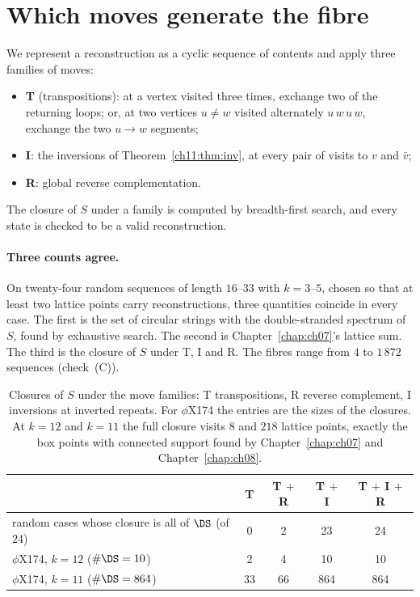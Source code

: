 \section{Which moves generate the fibre}\label{ch11:sec:gen}

We represent a reconstruction as a cyclic sequence of contents and apply three families of moves:
\begin{itemize}
\item \textbf{T} (transpositions): at a vertex visited three times, exchange two of the returning
loops; or, at two vertices $u\ne w$ visited alternately $u\,w\,u\,w$, exchange the two $u\to w$
segments;
\item \textbf{I}: the inversions of Theorem~\ref{ch11:thm:inv}, at every pair of visits to $v$ and $\bar v$;
\item \textbf{R}: global reverse complementation.
\end{itemize}
The closure of $S$ under a family is computed by breadth-first search, and every state is checked to be a
valid reconstruction.

\paragraph{Three counts agree.} On twenty-four random sequences of length $16$--$33$ with $k=3$--$5$,
chosen so that at least two lattice points carry reconstructions, three quantities coincide in every
case. The first is the set of circular strings with the double-stranded spectrum of $S$, found by
exhaustive search. The second is Chapter~\ref{chap:ch07}'s lattice sum. The third is the closure of $S$ under T, I and R.
The fibres range from $4$ to $1\,872$ sequences (check~(C)).

\begin{table}[t]
\centering\small
\begin{tabular}{lcccc}
\toprule
& T & T $+$ R & T $+$ I & T $+$ I $+$ R\\
\midrule
random cases whose closure is all of $\DS$ (of $24$) & 0 & 2 & 23 & 24\\
$\phi$X174, $k=12$ ($\#\DS=10$) & 2 & 4 & 10 & 10\\
$\phi$X174, $k=11$ ($\#\DS=864$) & 33 & 66 & 864 & 864\\
\bottomrule
\end{tabular}
\caption{Closures of $S$ under the move families: T transpositions, R reverse complement, I inversions
at inverted repeats. For $\phi$X174 the entries are the sizes of the closures. At $k=12$ and $k=11$ the full
closure visits $8$ and $218$ lattice points, exactly the box points with connected support found by
Chapter~\ref{chap:ch07} and Chapter~\ref{chap:ch08}.}\label{ch11:tab:gen}
\end{table}

